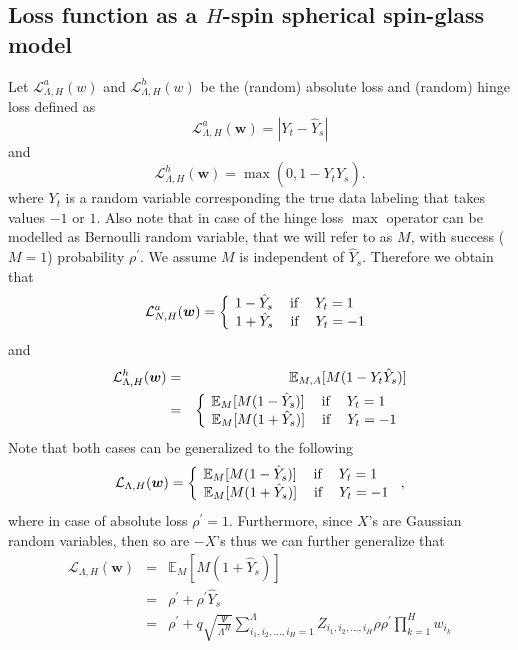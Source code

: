 \documentclass[twoside]{article}
\begin{document}
\subsection{Loss function as a $H$-spin spherical spin-glass model}

Let $\mathcal{L}^a_{\Lambda,H}(w)$ and $\mathcal{L}^h_{\Lambda,H}(w)$ be the (random) absolute loss and (random) hinge loss defined as
\[\mathcal{L}^a_{\Lambda,H}({\bm w}) = |Y_t - \hat{Y}_s|
\]
and
\[\mathcal{L}^h_{\Lambda,H}({\bm w}) = \max(0,1-Y_t\hat{Y}_s).
\]
where $Y_t$ is a random variable corresponding the true data labeling that takes values $-1$ or $1$. Also note that in case of the hinge loss $\max$ operator can be modelled as Bernoulli random variable, that we will refer to as $M$, with success ($M = 1$) probability $\rho^{'}$. We assume $M$ is independent of $\hat{Y}_s$. Therefore we obtain that
\[\mathcal{L}^a_{N,H}({\bm w}) = \left \{
  \begin{tabular}{c}
  $\!\!\!\!\!\!1 - \hat{Y}_s$ $\:\:\:\:$if$\:\:\:\:$ $Y_t = 1$ \\
  $\!1 + \hat{Y}_s$ $\:\:\:\:$if$\:\:\:\:$ $Y_t = -1$ \\
  \end{tabular}
\right.
\]
and
\begin{eqnarray*}
\mathcal{L}^h_{\Lambda,H}({\bm w}) &=& \mathbb{E}_{M,A}[M(1-Y_t\hat{Y}_s)]\\&=& \left \{
  \begin{tabular}{c}
  $\!\!\!\!\!\!\mathbb{E}_{M}[M(1 - \hat{Y}_s)]$ $\:\:\:\:$if$\:\:\:\:$ $Y_t = 1$ \\
  $\!\mathbb{E}_{M}[M(1 + \hat{Y}_s)]$ $\:\:\:\:$if$\:\:\:\:$ $Y_t = -1$ \\
  \end{tabular}
\right.
\end{eqnarray*}
Note that both cases can be generalized to the following
\[\mathcal{L}_{\Lambda,H}({\bm w}) = \left \{
  \begin{tabular}{c}
  $\!\!\!\!\!\!\mathbb{E}_{M}[M(1 - \hat{Y}_s)]$ $\:\:\:\:$if$\:\:\:\:$ $Y_t = 1$ \\
  $\!\mathbb{E}_{M}[M(1 + \hat{Y}_s)]$ $\:\:\:\:$if$\:\:\:\:$ $Y_t = -1$ \\
  \end{tabular}
\right.,
\]
where in case of absolute loss $\rho^{'} = 1$. Furthermore, since $X$'s are Gaussian random variables, then so are $-X$'s thus we can further generalize that
\begin{eqnarray*}
\mathcal{L}_{\Lambda,H}({\bm w}) \!\!\!\!\!&=&\!\!\!\!\! \mathbb{E}_{M}[M(1 + \hat{Y}_s)]\\
&=& \!\!\!\!\!\rho^{'} + \rho^{'}\hat{Y}_s\\
&=& \!\!\!\!\!\rho^{'} + q\sqrt{\!\!\frac{\Psi}{\Lambda^H}\!\!}\sum_{i_1,i_2,\dots,i_H=1}^{\Lambda}\!\!Z_{i_1,i_2,\dots,i_H}\rho\rho^{'}\prod_{k = 1}^{H}w_{i_k}
\end{eqnarray*}
\end{document}
